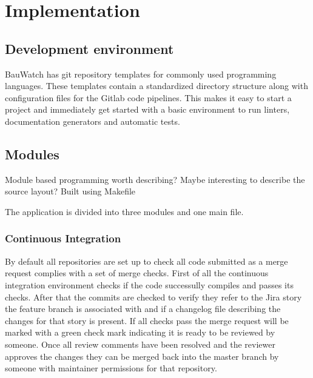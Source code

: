 \chapter{Implementation}
\section{Development environment}
BauWatch has git repository templates for commonly used programming languages.
These templates contain a standardized directory structure along with configuration files for the Gitlab code pipelines.
This makes it easy to start a project and immediately get started with a basic environment to run linters, documentation generators and automatic tests.

\section{Modules}
Module based programming worth describing?
Maybe interesting to describe the source layout?
Built using Makefile

The application is divided into three modules and one main file.

\subsection{Continuous Integration}
By default all repositories are set up to check all code submitted as a merge request complies with a set of merge checks.
First of all the continuous integration environment checks if the code successully compiles and passes its checks.
After that the commits are checked to verify they refer to the Jira story the feature branch is associated with and if a changelog file describing the changes for that story is present.
If all checks pass the merge request will be marked with a green check mark indicating it is ready to be reviewed by someone.
Once all review comments have been resolved and the reviewer approves the changes they can be merged back into the master branch by someone with maintainer permissions for that repository.




